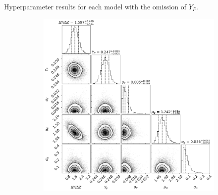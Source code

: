 \begin{table}
	\centering
	\caption{Hyperparameter results for each model with the omission of $Y_P$.}
	\label{tab:hparam_results}
	
\end{table}

\begin{figure}
    \centering
    \begin{subfigure}[b]{.66\linewidth}
        \centering
        \includegraphics[width=\textwidth]{figures/corner_plot_pp.png}
    \end{subfigure}


\end{figure}
